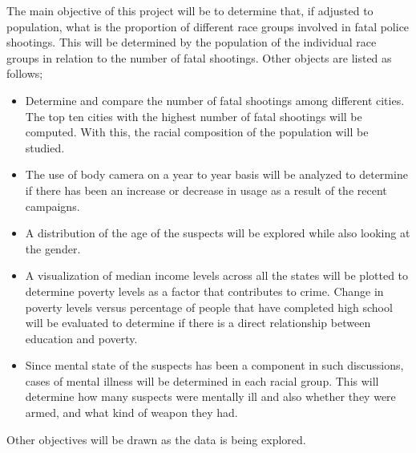 \documentclass[a4paper,12pt]{scrartcl}
\begin{document}
The main objective of this project will be to determine that, if adjusted to population, what is the proportion of different race groups involved in fatal police shootings. This will be determined by the population of the individual race groups in relation to the number of fatal shootings. Other objects are listed as follows;

\begin{itemize}
  \item Determine and compare the number of fatal shootings among different cities. The top ten cities with the highest number of fatal shootings will be computed. With this, the racial composition of the population will be studied.
  \item The use of body camera on a year to year basis will be analyzed to determine if there has been an increase or decrease in usage as a result of the recent campaigns.
  \item A distribution of the age of the suspects will be explored while also looking at the gender.
  \item A visualization of median income levels across all the states will be plotted to determine poverty levels as a factor that contributes to crime. Change in poverty levels versus percentage of people that have completed high school will be evaluated to determine if there is a direct relationship between education and poverty.
  \item Since mental state of the suspects has been a component in such discussions, cases of mental illness will be determined in each racial group. This will determine how many suspects were mentally ill and also whether they were armed, and what kind of weapon they had.
\end{itemize}
Other objectives will be drawn as the data is being explored.



\end{document}
